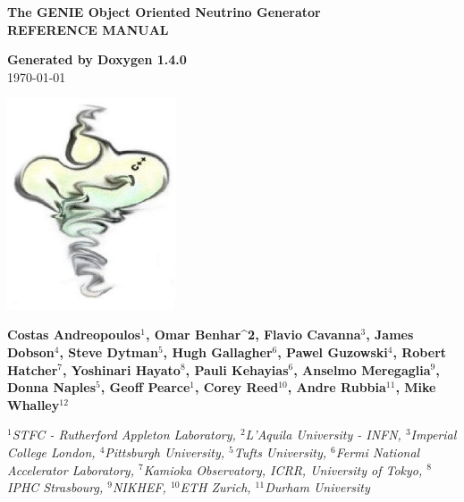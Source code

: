 \documentclass[a4paper]{book}
\begin{document}
\begin{titlepage}
\vspace*{3cm}
\begin{center}

{\Large \textbf{The GENIE Object Oriented Neutrino Generator}}\\
\vspace*{1cm}
{\Large \textbf{REFERENCE MANUAL}}\\
\vspace*{1cm}

{\large \textbf{Generated by Doxygen 1.4.0}}\\
\vspace*{0.5cm}
{\large \today}\\
\vspace*{1cm}

\includegraphics[width=5cm,keepaspectratio]{../../data/logo/genie_logo.eps}

\vspace*{0.6cm}

{\textbf{Costas Andreopoulos$^{1}$, Omar Benhar^{2}, Flavio Cavanna$^{3}$, James Dobson$^{4}$, Steve Dytman$^{5}$,
Hugh Gallagher$^{6}$, Pawel Guzowski$^{4}$, Robert Hatcher$^{7}$, Yoshinari Hayato$^{8}$, Pauli Kehayias$^{6}$, 
Anselmo Meregaglia$^{9}$, Donna Naples$^{5}$, Geoff Pearce$^{1}$, 
Corey Reed$^{10}$, Andre Rubbia$^{11}$, Mike Whalley$^{12}$}}\\
\vspace*{0.5cm}

{\textit{
$^{1}$STFC - Rutherford Appleton Laboratory,
$^{2}$L'Aquila University - INFN, 
$^{3}$Imperial College London, 
$^{4}$Pittsburgh University, 
$^{5}$Tufts University,
$^{6}$Fermi National Accelerator Laboratory, 
$^{7}$Kamioka Observatory, ICRR, University of Tokyo, 
$^{8}$IPHC Strasbourg, 
$^{9}$NIKHEF, 
$^{10}$ETH Zurich, 
$^{11}$Durham University}}

\end{center}
\end{titlepage}
\clearemptydoublepage
{}
\tableofcontents
\clearemptydoublepage
{}
\end{document}
